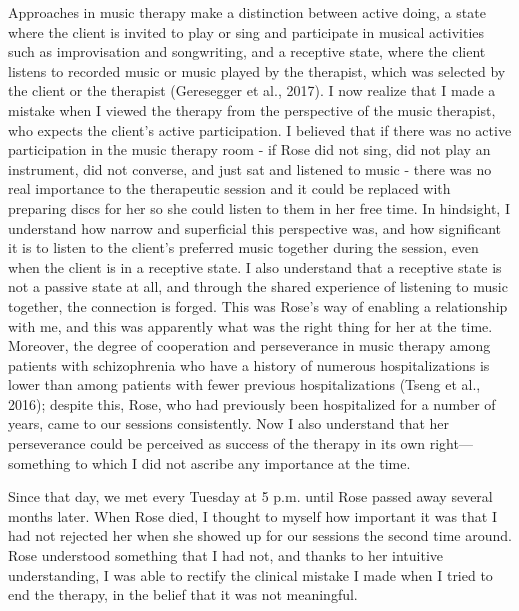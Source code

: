 \documentclass[authordate, empirical, issue]{jote-new-article}
\begin{document}
Approaches in music therapy make a distinction between active doing, a state where the client is invited to play or sing and participate in musical activities such as improvisation and songwriting, and a receptive state, where the client listens to recorded music or music played by the therapist, which was selected by the client or the therapist (Geresegger et al., 2017). I now realize that I made a mistake when I viewed the therapy from the perspective of the music therapist, who expects the client's active participation. I believed that if there was no active participation in the music therapy room - if Rose did not sing, did not play an instrument, did not converse, and just sat and listened to music - there was no real importance to the therapeutic session and it could be replaced with preparing discs for her so she could listen to them in her free time. In hindsight, I understand how narrow and superficial this perspective was, and how significant it is to listen to the client's preferred music together during the session, even when the client is in a receptive state. I also understand that a receptive state is not a passive state at all, and through the shared experience of listening to music together, the connection is forged. This was Rose's way of enabling a relationship with me, and this was apparently what was the right thing for her at the time. Moreover, the degree of cooperation and perseverance in music therapy among patients with schizophrenia who have a history of numerous hospitalizations is lower than among patients with fewer previous hospitalizations (Tseng et al., 2016); despite this, Rose, who had previously been hospitalized for a number of years, came to our sessions consistently. Now I also understand that her perseverance could be perceived as success of the therapy in its own right—something to which I did not ascribe any importance at the time.



Since that day, we met every Tuesday at 5 p.m. until Rose passed away several months later. When Rose died, I thought to myself how important it was that I had not rejected her when she showed up for our sessions the second time around. Rose understood something that I had not, and thanks to her intuitive understanding, I was able to rectify the clinical mistake I made when I tried to end the therapy, in the belief that it was not meaningful.
\end{document}

